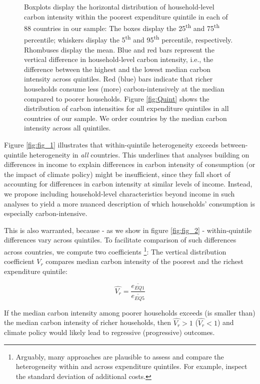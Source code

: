 \documentclass[12pt, a4paper]{article}
\newenvironment{subcaption2}
{\strut
\vspace{-5pt}
\begin{minipage}[b]{0.95\textwidth}
  \hspace*{-\parindent}
  \footnotesize}
 {\end{minipage}}
\begin{document}
\begin{figure}[ht!]
\begin{subcaption2}
    Boxplots display the horizontal distribution of household-level carbon intensity within the poorest expenditure quintile in each of 88 countries in our sample: The boxes display the 25\textsuperscript{th} and 75\textsuperscript{th} percentile; whiskers display the 5\textsuperscript{th} and 95\textsuperscript{th} percentile, respectively. Rhombuses display the mean. Blue and red bars represent the vertical difference in household-level carbon intensity, i.e., the difference between the highest and the lowest median carbon intensity across quintiles. Red (blue) bars indicate that richer households consume less (more) carbon-intensively at the median compared to poorer households. Figure \ref{fig:Quint} shows the distribution of carbon intensities for all expenditure quintiles in all countries of our sample. We order countries by the median carbon intensity across all quintiles.
    \end{subcaption2}
\end{figure}

Figure \ref{fig:fig_1} illustrates that within-quintile heterogeneity exceeds between-quintile heterogeneity in \textit{all} countries. This underlines that analyses building on differences in income to explain differences in carbon intensity of consumption (or the impact of climate policy) might be insufficient, since they fall short of accounting for differences in carbon intensity at similar levels of income. Instead, we propose including household-level characteristics beyond income in such analyses to yield a more nuanced description of which households' consumption is especially carbon-intensive.

This is also warranted, because - as we show in figure \ref{fig:fig_2} - within-quintile differences vary across quintiles. To facilitate comparison of such differences across countries, we compute two coefficients \autocite{Missbach.2024}\footnote{Arguably, many approaches are plausible to assess and compare the heterogeneity within and across expenditure quintiles. For example, \textcite{Cronin.2019} inspect the standard deviation of additional costs.}: The vertical distribution coefficient $\widehat{V_{r}}$ compares median carbon intensity of the poorest and the richest expenditure quintile:

\begin{equation}
    \widehat{V_{r}} = \frac{\overline{e_{EQ1}}}{\overline{e_{EQ5}}}
\end{equation}

If the median carbon intensity among poorer households exceeds (is smaller than) the median carbon intensity of richer households, then $\widehat{V_{r}}>1$ ($\widehat{V_{r}}<1$) and climate policy would likely lead to regressive (progressive) outcomes.
\end{document}
